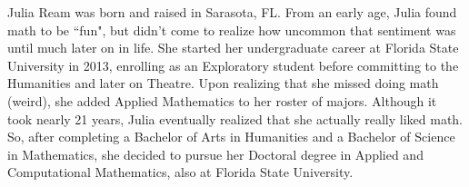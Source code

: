 \documentclass[11pt,expanded,copyright]{fsuthesis}
\begin{document}
\printbibliography

%

\begin{biosketch}
Julia Ream was born and raised in Sarasota, FL. From an early age, Julia found math to be ``fun", but didn't come to realize how uncommon that sentiment was until much later on in life. She started her undergraduate career at Florida State University in 2013, enrolling as an Exploratory student before committing to the Humanities and later on Theatre. Upon realizing that she missed doing math (weird), she added Applied Mathematics to her roster of majors. Although it took nearly 21 years, Julia eventually realized that she actually really liked math. So, after completing a Bachelor of Arts in Humanities and a Bachelor of Science in Mathematics, she decided to pursue her Doctoral degree in Applied and Computational Mathematics, also at Florida State University. 
\end{biosketch}
\end{document}
